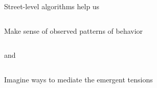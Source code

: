 \documentclass[presentation]{subfiles}
\begin{document}
\begin{frame}[standout]
    
\setlength{\parskip}{0em}

  \alert{Street-level algorithms} help us
  \bigskip
  \begin{columns}
  \begin{column}{0.75\textwidth}
  {\normalsize Make sense of observed patterns of behavior}
\end{column}
  \begin{column}{0.25\textwidth}
  \hfill {\footnotesize \textsc{}}
\end{column}
\end{columns}
\smallskip
and
\smallskip
  \begin{columns}
  \begin{column}{0.75\textwidth}
  {\normalsize Imagine ways to mediate the emergent tensions}
\end{column}
  \begin{column}{0.25\textwidth}
  \hfill {\footnotesize \textsc{}}
\end{column}
\end{columns}


\end{frame}
\end{document}
